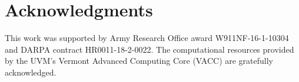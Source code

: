 \section{Acknowledgments}


This work was supported by 
Army Research Office award W911NF-16-1-10304
and DARPA contract HR0011-18-2-0022. 
The computational resources provided by the 
UVM's 
Vermont Advanced Computing Core 
(VACC)
are gratefully acknowledged.





